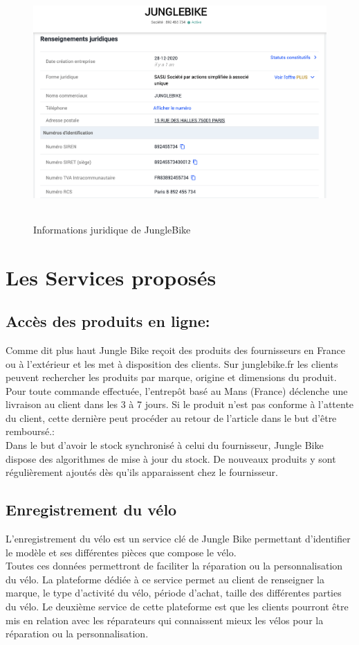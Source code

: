 \begin{figure}[h]
\begin{center}
\includegraphics[width=15cm,height=9cm]{images/junglebike_juridique.png}
\caption[Informations juridique de JungleBike]{Informations juridique de JungleBike}
\label{monlabel}
\end{center}
\end{figure}
\newpage

\section{Les Services proposés}
\subsection{Accès des produits en ligne:}
Comme dit plus haut Jungle Bike reçoit des produits des fournisseurs en France ou à l'extérieur et les met à disposition des clients. Sur junglebike.fr les clients peuvent rechercher les produits par marque, origine et dimensions du produit. Pour toute commande effectuée, l'entrepôt basé au Mans (France) déclenche une livraison au client dans les 3 à 7 jours. Si le produit n’est pas conforme à l’attente du client, cette dernière peut procéder au retour de l’article dans le but d'être remboursé.:\\
	Dans le but d’avoir le stock synchronisé à celui du fournisseur, Jungle Bike dispose des algorithmes de mise à jour du stock. De nouveaux produits y sont régulièrement ajoutés dès qu’ils apparaissent chez le fournisseur.


\subsection{Enregistrement du vélo}
L’enregistrement du vélo est un service clé de Jungle Bike permettant d’identifier le modèle et ses différentes pièces que compose le vélo.\\
Toutes ces données permettront de faciliter la réparation ou la personnalisation du vélo. La plateforme dédiée à ce service permet au client de renseigner la marque, le type d’activité du vélo, période d’achat, taille des différentes parties du vélo. Le deuxième service de cette plateforme est que les clients pourront être mis en relation avec les réparateurs qui connaissent mieux les vélos pour la réparation ou la personnalisation.

